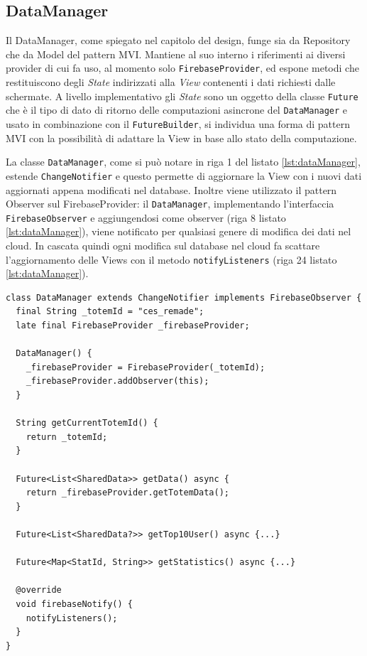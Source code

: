 \subsection{DataManager}
Il DataManager, come spiegato nel capitolo del design, funge sia da Repository che da Model del pattern MVI. Mantiene al suo interno i riferimenti ai diversi provider di cui fa uso, al momento solo \texttt{FirebaseProvider}, ed espone metodi che restituiscono degli \textit{State} indirizzati alla \textit{View} contenenti i dati richiesti dalle schermate. A livello implementativo gli \textit{State} sono un oggetto della classe \texttt{Future} che è il tipo di dato di ritorno delle computazioni asincrone del \texttt{DataManager} e usato in combinazione con il \texttt{FutureBuilder}, si individua una forma di pattern MVI con la possibilità di adattare la View in base allo stato della computazione.

La classe \texttt{DataManager}, come si può notare in riga 1 del listato \ref{lst:dataManager}, estende \texttt{ChangeNotifier} e questo permette di aggiornare la View con i nuovi dati aggiornati appena modificati nel database.
Inoltre viene utilizzato il pattern Observer sul FirebaseProvider: il \texttt{DataManager}, implementando l'interfaccia \texttt{FirebaseObserver} e aggiungendosi come observer (riga 8 listato \ref{lst:dataManager}), viene notificato per qualsiasi genere di modifica dei dati nel cloud.
In cascata quindi ogni modifica sul database nel cloud fa scattare l'aggiornamento delle Views con il metodo \texttt{notifyListeners} (riga 24 listato \ref{lst:dataManager}).
\vspace{\baselineskip}
\begin{lstlisting}[style=FlutterStyle, caption={Classe DataManager}, label={lst:dataManager}]
class DataManager extends ChangeNotifier implements FirebaseObserver {
  final String _totemId = "ces_remade";
  late final FirebaseProvider _firebaseProvider;

  DataManager() {
    _firebaseProvider = FirebaseProvider(_totemId);
    _firebaseProvider.addObserver(this);
  }

  String getCurrentTotemId() {
    return _totemId;
  }

  Future<List<SharedData>> getData() async {
    return _firebaseProvider.getTotemData();
  }

  Future<List<SharedData?>> getTop10User() async {...}

  Future<Map<StatId, String>> getStatistics() async {...}

  @override
  void firebaseNotify() {
    notifyListeners(); 
  }
}
\end{lstlisting}
\newpage
